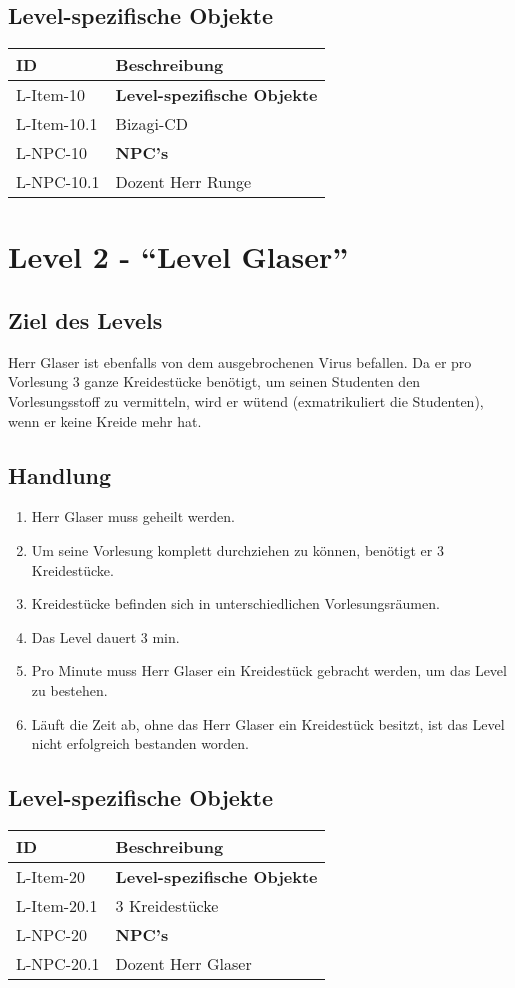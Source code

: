 \subsection{Level-spezifische Objekte}
\begin{tabularx}{\textwidth}{|l|l|}
\toprule
\textbf{ID} & \textbf{Beschreibung}\\
\endhead
\hline
L-Item-10 & \textbf{Level-spezifische Objekte} \\
L-Item-10.1 & Bizagi-CD  \\

\hline
L-NPC-10 & \textbf{NPC's} \\
L-NPC-10.1 & Dozent Herr Runge \\
\hline
\end{tabularx}



\section{Level 2 - \enquote{Level Glaser}}
\subsection{Ziel des Levels}
Herr Glaser ist ebenfalls von dem ausgebrochenen Virus befallen. Da er pro Vorlesung 3 ganze Kreidestücke benötigt, um seinen Studenten den Vorlesungsstoff zu vermitteln, wird er wütend (exmatrikuliert die Studenten), wenn er keine Kreide mehr hat.
\subsection{Handlung}
\begin{enumerate}
\item Herr Glaser muss geheilt werden.
\item Um seine Vorlesung komplett durchziehen zu können, benötigt er 3 Kreidestücke.
\item Kreidestücke befinden sich in unterschiedlichen Vorlesungsräumen.
\item Das Level dauert 3 min. 
\item Pro Minute muss Herr Glaser ein Kreidestück gebracht werden, um das Level zu bestehen. 
\item Läuft die Zeit ab, ohne das Herr Glaser ein Kreidestück besitzt, ist das Level nicht erfolgreich bestanden worden.
\end{enumerate}
\subsection{Level-spezifische Objekte}
\begin{tabularx}{\textwidth}{|l|l|}
\toprule
\textbf{ID} & \textbf{Beschreibung}\\
\endhead
\hline
L-Item-20 & \textbf{Level-spezifische Objekte} \\
L-Item-20.1 & 3 Kreidestücke \\
\hline
L-NPC-20 & \textbf{NPC's} \\
L-NPC-20.1 & Dozent Herr Glaser \\
\hline
\end{tabularx}




